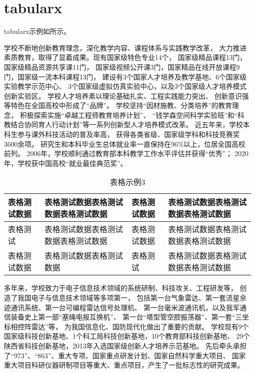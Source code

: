 \section{tabularx}
tabularx示例如所示。
\par
学校不断地创新教育理念，深化教学内容、课程体系与实践教学改革，
大力推进素质教育，取得了显着成果。现有国家级特色专业14个，
国家级精品课程13门，国家级精品资源共享课11门，
国家级视频公开课3门，国家精品在线开放课程9门，国家级一流本科课程13门，
建设有3个国家人才培养及教学基地、6个国家级实验教学示范中心、
3个国家级虚拟仿真实验中心，以及3个国家级人才培养模式创新实验区。
学校人才培养素以理论基础扎实、工程实践能力突出、
创新意识强等特色在全国高校中形成了“品牌”。
学校坚持“因材施教、分类培养”的教育理念，
积极探索实施“卓越工程师教育培养计划”、
“钱学森空间科学实验班”和“科教结合协同育人行动计划”等一系列创新型人才培养模式改革。
近五年来，学校本科生参与课外科技活动的普及率高，
获得各类省级、国家级学科和科技竞赛奖3600余项。
研究生和本科毕业生总体就业率一直保持在96\%以上，位居全国高校前列。
2006年，学校顺利通过教育部本科教学工作水平评估并获得“优秀”；
2020年，学校获中国高校“就业最佳典范奖”。
\begin{table}
\renewcommand{\arraystretch}{1.5}
\caption{表格示例3}
\label{tab3}
\centering
\begin{tabularx}{\linewidth}{lXlX}
\toprule
表格测试数据 & 表格测试数据表格测试数据表格测试数据 & 表格测试数据 & 表格测试数据表格测试数据表格测试数据 \\ \hline
表格测试 & 表格测试数据表格测试数据表格测试数据 & 表格测试数据 & 表格测试数据表格测试数据表格测试数据 \\ \hline
表格测试数据 & 表格测试数据表格测试数据 & 表格测试 & 表格测试数据表格测试数据表格测试数据 \\ \hline
\bottomrule
\end{tabularx}
\end{table}
\par
多年来，学校致力于电子信息技术领域的系统研制、科技攻关、工程研发等，
创造了我国电子与信息技术领域等多项第一，
包括第一台气象雷达、第一套流星余迹通讯系统、第一台可编程雷达信号处理机、
第一台毫米波通讯机，以及我军通信装备史上第一部“塞绳电报互换机”、
第一台“塔型管空腔振荡器”、第一套“三坐标相控阵雷达”等，
为我国信息化、国防现代化做出了重要的贡献。
学校现有9个国家级科技创新基地、1个科工局科技创新基地，10个教育部科技创新基地、
29个陕西省科技创新基地，2013年入选国家级创新人才培养示范基地。
先后牵头承担了“973”、“863”、重大专项、国家重点研发计划、国家自然科学重大项目、
国家重大项目科研仪器研制项目等重大、重点项目，产生了一批标志性的研究成果。
